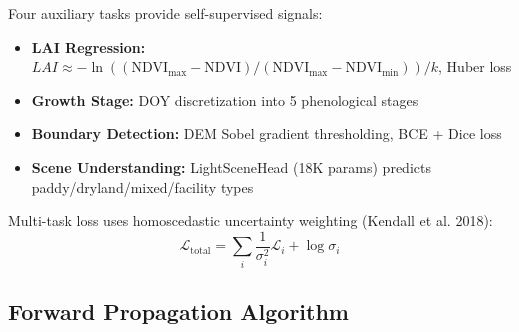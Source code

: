Four auxiliary tasks provide self-supervised signals:
\begin{itemize}
    \item \textbf{LAI Regression:} $LAI \approx -\ln((\text{NDVI}_{\max} - \text{NDVI})/
    (\text{NDVI}_{\max} - \text{NDVI}_{\min})) / k$, Huber loss
    \item \textbf{Growth Stage:} DOY discretization into 5 phenological stages
    \item \textbf{Boundary Detection:} DEM Sobel gradient thresholding, BCE + Dice loss
    \item \textbf{Scene Understanding:} LightSceneHead (18K params) predicts
    paddy/dryland/mixed/facility types
\end{itemize}

Multi-task loss uses homoscedastic uncertainty weighting (Kendall et al. 2018):
\begin{equation}
    \mathcal{L}_{\text{total}} = \sum_i \frac{1}{\sigma_i^2}\mathcal{L}_i + \log\sigma_i
\end{equation}

\subsection{Forward Propagation Algorithm}

